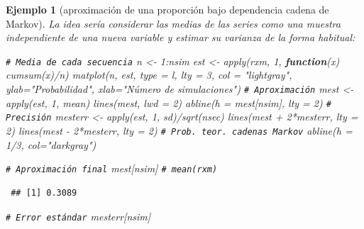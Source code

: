 \documentclass[
]{book}
\newenvironment{Shaded}{\begin{snugshade}}{\end{snugshade}}
\newcommand{\AttributeTok}[1]{\textcolor[rgb]{0.77,0.63,0.00}{#1}}
\newcommand{\CommentTok}[1]{\textcolor[rgb]{0.56,0.35,0.01}{\textit{#1}}}
\newcommand{\ControlFlowTok}[1]{\textcolor[rgb]{0.13,0.29,0.53}{\textbf{#1}}}
\newcommand{\DecValTok}[1]{\textcolor[rgb]{0.00,0.00,0.81}{#1}}
\newcommand{\FunctionTok}[1]{\textcolor[rgb]{0.00,0.00,0.00}{#1}}
\newcommand{\NormalTok}[1]{#1}
\newcommand{\OtherTok}[1]{\textcolor[rgb]{0.56,0.35,0.01}{#1}}
\newcommand{\SpecialCharTok}[1]{\textcolor[rgb]{0.00,0.00,0.00}{#1}}
\newcommand{\StringTok}[1]{\textcolor[rgb]{0.31,0.60,0.02}{#1}}
\theoremstyle{break}
\newtheorem{example}{Ejemplo}[chapter]
\theoremstyle{nonumberplain}
\renewcommand{\CommentTok}[1]{\textcolor[rgb]{0.41,0.41,0.41}{\texttt{#1}}}
\begin{document}
\begin{example}[aproximación de una proporción bajo dependencia cadena de Markov]
La idea sería considerar las medias de las series como una muestra independiente de una nueva variable y estimar su varianza de la forma habitual:

\begin{Shaded}
\begin{Highlighting}[]
\CommentTok{\# Media de cada secuencia}
\NormalTok{n }\OtherTok{\textless{}{-}} \DecValTok{1}\SpecialCharTok{:}\NormalTok{nsim}
\NormalTok{est }\OtherTok{\textless{}{-}} \FunctionTok{apply}\NormalTok{(rxm, }\DecValTok{1}\NormalTok{, }\ControlFlowTok{function}\NormalTok{(x) }\FunctionTok{cumsum}\NormalTok{(x)}\SpecialCharTok{/}\NormalTok{n)}
\FunctionTok{matplot}\NormalTok{(n, est, }\AttributeTok{type =} \StringTok{\textquotesingle{}l\textquotesingle{}}\NormalTok{, }\AttributeTok{lty =} \DecValTok{3}\NormalTok{, }\AttributeTok{col =} \StringTok{"lightgray"}\NormalTok{,}
     \AttributeTok{ylab=}\StringTok{"Probabilidad"}\NormalTok{, }\AttributeTok{xlab=}\StringTok{"Número de simulaciones"}\NormalTok{)}
\CommentTok{\# Aproximación}
\NormalTok{mest }\OtherTok{\textless{}{-}} \FunctionTok{apply}\NormalTok{(est, }\DecValTok{1}\NormalTok{, mean)}
\FunctionTok{lines}\NormalTok{(mest, }\AttributeTok{lwd =} \DecValTok{2}\NormalTok{)}
\FunctionTok{abline}\NormalTok{(}\AttributeTok{h =}\NormalTok{ mest[nsim], }\AttributeTok{lty =} \DecValTok{2}\NormalTok{)}
\CommentTok{\# Precisión}
\NormalTok{mesterr }\OtherTok{\textless{}{-}} \FunctionTok{apply}\NormalTok{(est, }\DecValTok{1}\NormalTok{, sd)}\SpecialCharTok{/}\FunctionTok{sqrt}\NormalTok{(nsec)}
\FunctionTok{lines}\NormalTok{(mest }\SpecialCharTok{+} \DecValTok{2}\SpecialCharTok{*}\NormalTok{mesterr, }\AttributeTok{lty =} \DecValTok{2}\NormalTok{)}
\FunctionTok{lines}\NormalTok{(mest }\SpecialCharTok{{-}} \DecValTok{2}\SpecialCharTok{*}\NormalTok{mesterr, }\AttributeTok{lty =} \DecValTok{2}\NormalTok{)}
\CommentTok{\# Prob. teor. cadenas Markov}
\FunctionTok{abline}\NormalTok{(}\AttributeTok{h =} \DecValTok{1}\SpecialCharTok{/}\DecValTok{3}\NormalTok{, }\AttributeTok{col=}\StringTok{"darkgray"}\NormalTok{)     }

\CommentTok{\# Aproximación final}
\NormalTok{mest[nsim] }\CommentTok{\# mean(rxm)}
\end{Highlighting}
\end{Shaded}

\begin{verbatim}
 ## [1] 0.3089
\end{verbatim}

\begin{Shaded}
\begin{Highlighting}[]
\CommentTok{\# Error estándar}
\NormalTok{mesterr[nsim]}
\end{Highlighting}
\end{Shaded}


\end{example}
\end{document}
